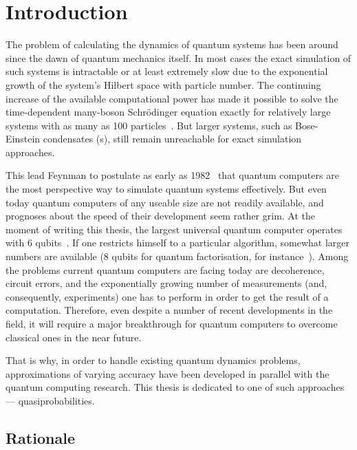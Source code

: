 \chapter{Introduction}

The problem of calculating the dynamics of quantum systems has been around since the dawn of quantum mechanics itself.
In most cases the exact simulation of such systems is intractable or at least extremely slow due to the exponential growth of the system's Hilbert space with particle number.
The continuing increase of the available computational power has made it possible to solve the time-dependent many-boson Schr\"odinger equation exactly for relatively large systems with as many as 100 particles~\cite{Sakmann2009}.
But larger systems, such as Bose-Einstein condensates (s), still remain unreachable for exact simulation approaches.

This lead Feynman to postulate as early as 1982~\cite{Feynman1982} that quantum computers are the most perspective way to simulate quantum systems effectively.
But even today quantum computers of any useable size are not readily available, and prognoses about the speed of their development seem rather grim.
At the moment of writing this thesis, the largest universal quantum computer operates with 6 qubits~\cite{Lanyon2011}.
If one restricts himself to a particular algorithm, somewhat larger numbers are available (8 qubits for quantum factorisation, for instance~\cite{Xu2012}).
Among the problems current quantum computers are facing today are decoherence, circuit errors, and the exponentially growing number of measurements (and, consequently, experiments) one has to perform in order to get the result of a computation.
Therefore, even despite a number of recent developments in the field, it will require a major breakthrough for quantum computers to overcome classical ones in the near future.

That is why, in order to handle existing quantum dynamics problems, approximations of varying accuracy have been developed in parallel with the quantum computing research.
This thesis is dedicated to one of such approaches --- quasiprobabilities.


\section{Rationale}

